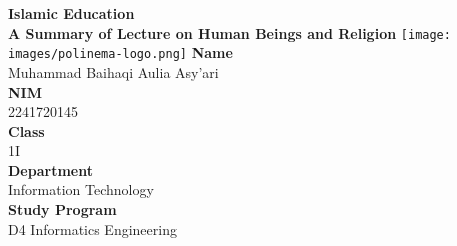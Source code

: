 \documentclass[12pt,titlepage]{article}
\newcommand{\vSubject}{Islamic Education}
\newcommand{\vSubtitle}{A Summary of Lecture on}
\newcommand{\vSubsubtitle}{Human Beings and Religion}
\newcommand{\vName}{Muhammad Baihaqi Aulia Asy'ari}
\newcommand{\vNIM}{2241720145}
\newcommand{\vClass}{1I}
\newcommand{\vDepartment}{Information Technology}
\newcommand{\vStudyProgram}{D4 Informatics Engineering}
\begin{document}
\begin{titlepage}
    \centering
    \vfill
    {\bfseries\LARGE
        \vSubject\\
        \vskip0.25cm
        \vSubtitle
        \vskip0.25cm
        \vSubsubtitle
    }
    \vfill
    \texttt{[image: images/polinema-logo.png]}
    \vfill
    {
        \textbf{Name}\\
        \vName\\
        \vskip0.5cm
        \textbf{NIM}\\
        \vNIM\\
        \vskip0.5cm
        \textbf{Class}\\
        \vClass\\
        \vskip0.5cm
        \textbf{Department}\\
        \vDepartment\\
        \vskip0.5cm
        \textbf{Study Program}\\
        \vStudyProgram
    }
\end{titlepage}

\newpage

\end{document}
